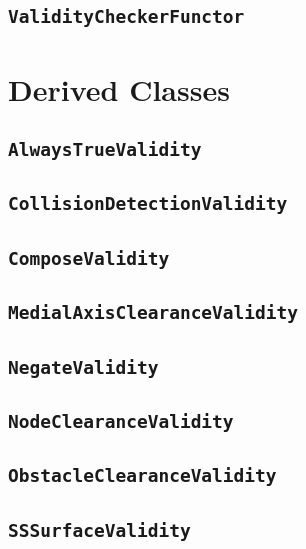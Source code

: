 \subsection{\texttt{ValidityCheckerFunctor}}

\section{Derived Classes}

\subsection{\texttt{AlwaysTrueValidity}}

\subsection{\texttt{CollisionDetectionValidity}}

\subsection{\texttt{ComposeValidity}}

\subsection{\texttt{MedialAxisClearanceValidity}}

\subsection{\texttt{NegateValidity}}

\subsection{\texttt{NodeClearanceValidity}}

\subsection{\texttt{ObstacleClearanceValidity}}

\subsection{\texttt{SSSurfaceValidity}}

